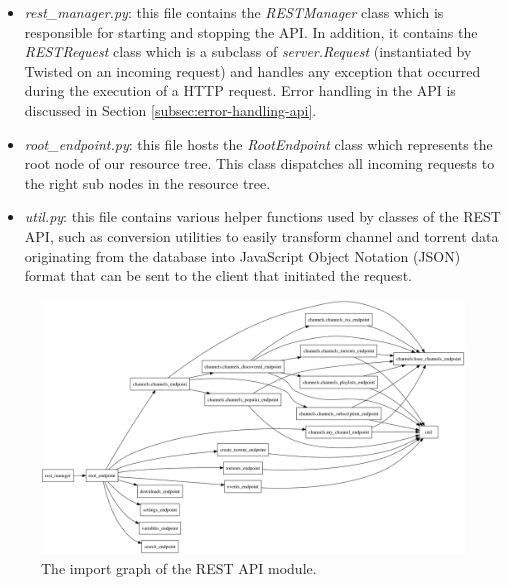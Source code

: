 \begin{itemize}
	\item \emph{rest\_manager.py}: this file contains the \emph{RESTManager} class which is responsible for starting and stopping the API. In addition, it  contains the \emph{RESTRequest} class which is a subclass of \emph{server.Request} (instantiated by Twisted on an incoming request) and handles any exception that occurred during the execution of a HTTP request. Error handling in the API is discussed in Section  \ref{subsec:error-handling-api}.
	\item \emph{root\_endpoint.py}: this file hosts the \emph{RootEndpoint} class which represents the root node of our resource tree. This class dispatches all incoming requests to the right sub nodes in the resource tree.
	\item \emph{util.py}: this file contains various helper functions used by classes of the REST API, such as conversion utilities to easily transform channel and torrent data originating from the database into JavaScript Object Notation (JSON) format that can be sent to the client that initiated the request.
\end{itemize}

\begin{figure}[h!]
	\centering
	\includegraphics[width=1.0\columnwidth]{images/improving_qa/importgraph_api}
	\caption{The import graph of the REST API module.}
	\label{fig:importgraph-api}
\end{figure}

